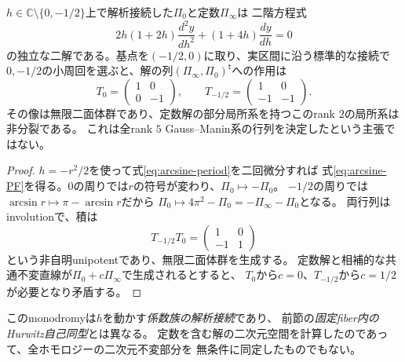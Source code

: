 \begin{proposition}
\label{prop:period-dihedral-monodromy}
$h\in\mathbb C\setminus\{0,-1/2\}$上で解析接続した$\Pi_0$と定数$\Pi_\infty$は
二階方程式
\begin{equation}\label{eq:arcsine-PF}
 2h(1+2h)\frac{d^2y}{dh^2}+(1+4h)\frac{dy}{dh}=0
\end{equation}
の独立な二解である。基点を$(-1/2,0)$に取り、実区間に沿う標準的な接続で
$0,-1/2$の小周回を選ぶと、解の列$(\Pi_\infty,\Pi_0)^{\mathsf t}$への作用は
\[
 T_0=\begin{pmatrix}1&0\\0&-1\end{pmatrix},\qquad
 T_{-1/2}=\begin{pmatrix}1&0\\-1&-1\end{pmatrix}.
\]
その像は無限二面体群であり、定数解の部分局所系を持つこのrank $2$の局所系は非分裂である。
これは全rank $5$ Gauss--Manin系の行列を決定したという主張ではない。
\end{proposition}
\begin{proof}
$h=-r^2/2$を使って式\eqref{eq:arcsine-period}を二回微分すれば
式\eqref{eq:arcsine-PF}を得る。$0$の周りでは$r$の符号が変わり、$\Pi_0\mapsto-\Pi_0$。
$-1/2$の周りでは$\arcsin r\mapsto\pi-\arcsin r$だから
$\Pi_0\mapsto4\pi^2-\Pi_0=-\Pi_\infty-\Pi_0$となる。
両行列はinvolutionで、積は
\[
 T_{-1/2}T_0=\begin{pmatrix}1&0\\-1&1\end{pmatrix}
\]
という非自明unipotentであり、無限二面体群を生成する。
定数解と相補的な共通不変直線が$\Pi_0+c\Pi_\infty$で生成されるとすると、
$T_0$から$c=0$、$T_{-1/2}$から$c=1/2$が必要となり矛盾する。
\end{proof}

このmonodromyは$h$を動かす\emph{係数族の解析接続}であり、
前節の\emph{固定fiber内のHurwitz自己同型}とは異なる。
定数を含む解の二次元空間を計算したのであって、全ホモロジーの二次元不変部分を
無条件に同定したものでもない。


